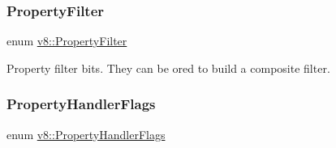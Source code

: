 \subsubsection{\texorpdfstring{Property\+Filter}{PropertyFilter}}
{\footnotesize\ttfamily enum \mbox{\hyperlink{namespacev8_afbf02b6b1152a3e25d7bde90798209ac}{v8\+::\+Property\+Filter}}}

Property filter bits. They can be or\textquotesingle{}ed to build a composite filter. \mbox{\label{namespacev8_af4789f0aeb8680e353901a35810cac1a}} 
\subsubsection{\texorpdfstring{Property\+Handler\+Flags}{PropertyHandlerFlags}}
{\footnotesize\ttfamily enum \mbox{\hyperlink{namespacev8_af4789f0aeb8680e353901a35810cac1a}{v8\+::\+Property\+Handler\+Flags}}\hspace{0.3cm}{\ttfamily [strong]}}

